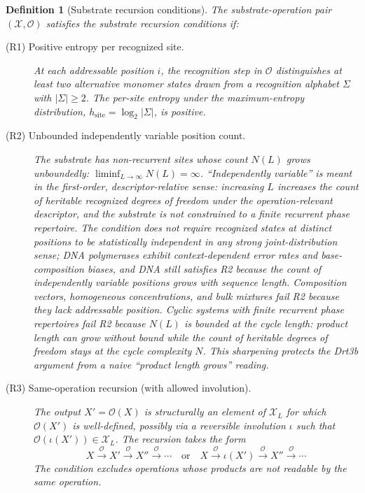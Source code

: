 \documentclass[aps,prx,reprint,amsmath,amssymb,floatfix,superscriptaddress,nofootinbib]{revtex4-2}
\theoremstyle{plain-thm}
\theoremstyle{definition-thm}
\newtheorem{definition}{Definition}
\newcommand{\Xset}{\mathcal{X}}
\newcommand{\Op}{\mathcal{O}}
\begin{document}
\begin{definition}[Substrate recursion conditions]
\label{def:conditions}
The substrate-operation pair $(\Xset, \Op)$ satisfies the substrate recursion conditions if:

\begin{description}
\item[(R1) Positive entropy per recognized site.] At each addressable position $i$, the recognition step in $\Op$ distinguishes at least two alternative monomer states drawn from a recognition alphabet $\Sigma$ with $|\Sigma| \ge 2$. The per-site entropy under the maximum-entropy distribution, $h_{\mathrm{site}} = \log_2 |\Sigma|$, is positive.

\item[(R2) Unbounded independently variable position count.] The substrate has non-recurrent sites whose count $N(L)$ grows unboundedly: $\liminf_{L \to \infty} N(L) = \infty$. ``Independently variable'' is meant in the first-order, descriptor-relative sense: increasing $L$ increases the count of heritable recognized degrees of freedom under the operation-relevant descriptor, and the substrate is not constrained to a finite recurrent phase repertoire. The condition does not require recognized states at distinct positions to be statistically independent in any strong joint-distribution sense; DNA polymerases exhibit context-dependent error rates and base-composition biases, and DNA still satisfies R2 because the count of independently variable positions grows with sequence length. Composition vectors, homogeneous concentrations, and bulk mixtures fail R2 because they lack addressable position. Cyclic systems with finite recurrent phase repertoires fail R2 because $N(L)$ is bounded at the cycle length: product length can grow without bound while the count of heritable degrees of freedom stays at the cycle complexity $N$. This sharpening protects the Drt3b argument from a naive ``product length grows'' reading.

\item[(R3) Same-operation recursion (with allowed involution).] The output $X' = \Op(X)$ is structurally an element of $\Xset_L$ for which $\Op(X')$ is well-defined, possibly via a reversible involution $\iota$ such that $\Op(\iota(X')) \in \Xset_L$. The recursion takes the form
\[
X \xrightarrow{\Op} X' \xrightarrow{\Op} X'' \xrightarrow{\Op} \cdots \quad \text{or} \quad X \xrightarrow{\Op} \iota(X') \xrightarrow{\Op} X'' \xrightarrow{\Op} \cdots
\]
The condition excludes operations whose products are not readable by the same operation.


\end{description}
\end{definition}
\end{document}
